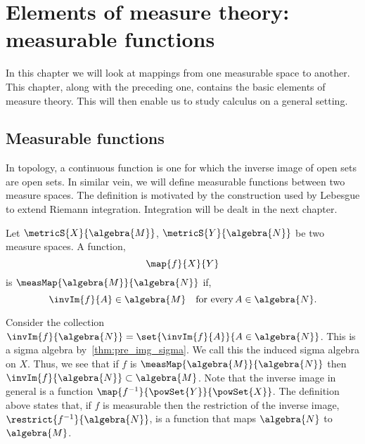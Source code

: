 \chapter{Elements of measure theory: measurable functions}
In this chapter we will look at mappings from one measurable space to another. This chapter, along with the 
preceding one, contains the basic elements of measure theory. 
This will then enable us to study calculus on a general setting.
\section{Measurable functions}
In topology, a continuous function is one for which the inverse image of open sets are open sets. In similar
vein, we will define measurable functions between two measure spaces. The definition is motivated by the
construction used by Lebesgue to extend Riemann integration. Integration will be dealt in the next chapter.
\begin{Definition}[name=Measurable functions]
    Let $\metricS{X}{\algebra{M}}$, $\metricS{Y}{\algebra{N}}$ be two measure spaces. A function,
    \[\map{f}{X}{Y}\]
    is $\measMap{\algebra{M}}{\algebra{N}}$ if,
    \[\invIm{f}{A} \in \algebra{M}\quad\text{for every}\,{A\in\algebra{N}}.\]
\end{Definition}
Consider the collection $\invIm{f}{\algebra{N}} = \set{\invIm{f}{A}}{A\in\algebra{N}}$. This is a sigma algebra
by~\ref{thm:pre_img_sigma}. We call this the induced sigma algebra on $X$. Thus, we see that if $f$ is
$\measMap{\algebra{M}}{\algebra{N}}$ then $\invIm{f}{\algebra{N}} \subset \algebra{M}$. Note that the inverse
image in general is a function $\map{f^{-1}}{\powSet{Y}}{\powSet{X}}$. The definition above states that, if
$f$ is measurable then the
restriction of the inverse image, $\restrict{f^{-1}}{\algebra{N}}$, 
is a function that maps $\algebra{N}$ to $\algebra{M}$.


